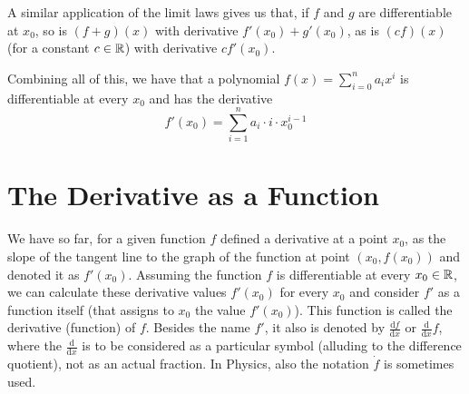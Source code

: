 A similar application of the limit laws gives us that, if $f$ and $g$ are
differentiable at $x_0$, so is  $(f+g)(x)$ with derivative
$f'(x_0)+g'(x_0)$, as is $(cf)(x)$ (for a constant $c\in{\mathbb R}$) with derivative
$cf'(x_0)$.
\smallskip

Combining all of this, we have that a polynomial $f(x)=\sum_{i=0}^n a_ix^i$
is differentiable at every $x_0$ and has the derivative
\[
f'(x_0)=\sum_{i=1}^n a_i\cdot i\cdot x_0^{i-1}
\]

\section{The Derivative as a Function}

We have so far, for a given function $f$ defined a derivative at a point
$x_0$, as the slope of the tangent line to the graph of the function at
point $(x_0,f(x_0))$ and denoted it as $f'(x_0)$. Assuming the function $f$
is differentiable at every
$x_0\in{\mathbb R}$, we can calculate these derivative values $f'(x_0)$ for every
$x_0$ and consider $f'$ as a function itself (that assigns to $x_0$ the
value $f'(x_0)$). This function is called the derivative (function) of $f$.
Besides the name $f'$, it also is denoted by
$\displaystyle\frac{\mbox{d}f}{\mbox{d}x}$ or
$\displaystyle\frac{\mbox{d}}{\mbox{d}x} f$, where the
$\frac{\mbox{d}}{\mbox{d}x}$ is to be considered as a particular symbol
(alluding to the difference quotient), not
as an actual fraction. In Physics, also the notation $\dot f$ is sometimes
used.

